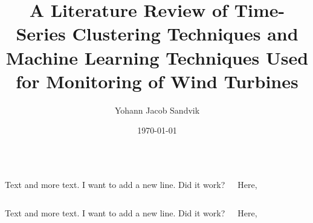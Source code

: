 \documentclass[18pt, a3paper, portrait]{tikzposter}
\title{A Literature Review of Time-Series Clustering Techniques and Machine Learning Techniques Used for Monitoring of Wind Turbines}
\author{Yohann Jacob Sandvik}
\date{\today}
\institute{Institute of Electronic Systems - NTNU}
\begin{document}
 
\maketitle 

\begin{columns}
    {
        Text and more text. I want to add a new line. \newline
        Did it work?
        \vspace{4cm}
    }
 
    {
        Here,  
        \vspace{4cm}
    }
\end{columns}
 
\begin{columns}
    {
        Text and more text. I want to add a new line. \newline
        Did it work?
        \vspace{4cm}
    }
 
    {
        Here,  
        \vspace{4cm}
    }
\end{columns}

{
    \blindtext
}
\end{document}
